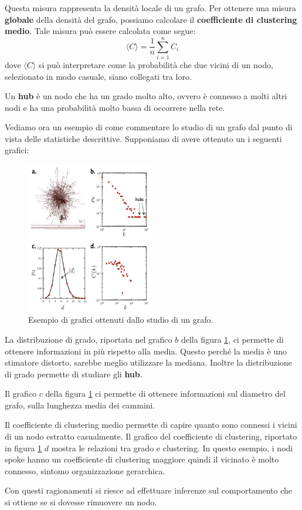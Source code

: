 Questa misura rappresenta la densità locale di un grafo. Per ottenere una
misura \textbf{globale} della densità del grafo, possiamo calcolare il
\textbf{coefficiente di clustering medio}. Tale misura può essere calcolata come
segue:
\begin{equation}
    \langle C \rangle = \frac{1}{n} \sum_{i=1}^{n} C_i
\end{equation}
dove $\langle C \rangle$ si può interpretare come la probabilità che due vicini
di un nodo, selezionato in modo casuale, siano collegati tra loro.
\begin{definizione}
    Un \textbf{hub} è un nodo che ha un grado molto alto, ovvero è connesso a
    molti altri nodi e ha una probabilità molto bassa di occorrere nella rete.
\end{definizione}
\begin{esempio}
    Vediamo ora un esempio di come commentare lo studio di un grafo dal punto di
    vista delle statistiche descrittive. Supponiamo di avere ottenuto un
    i seguenti grafici:
    \begin{figure}[!ht]
        \centering
        \includegraphics[width=0.5\textwidth]{./img/net/esempio1.png}
        \caption{Esempio di grafici ottenuti dallo studio di un grafo.}
        \label{fig:graphstats}
    \end{figure}

    La distribuzione di grado, riportata nel grafico $b$ della figura \ref{fig:graphstats},
    ci permette di ottenere informazioni in più rispetto alla media. Questo
    perché la media è uno stimatore distorto, sarebbe meglio utilizzare la
    mediana. Inoltre la distribuzione di grado permette di studiare gli \textbf{hub}.

    Il grafico $c$ della figura \ref{fig:graphstats} ci permette di ottenere
    informazioni sul diametro del grafo, sulla lunghezza media dei cammini.

    Il coefficiente di clustering medio permette di capire quanto sono connessi
    i vicini di un nodo estratto casualmente. Il grafico del coefficiente di
    clustering, riportato in figura \ref{fig:graphstats} $d$ mostra le relazioni
    tra grado e clustering. In questo esempio, i nodi spoke hanno un coefficiente
    di clustering maggiore quindi il vicinato è molto connesso, sintomo
    organizzazione gerarchica.

    Con questi ragionamenti si riesce ad effettuare inferenze sul comportamento
    che si ottiene se si dovesse rimuovere un nodo.
\end{esempio}

